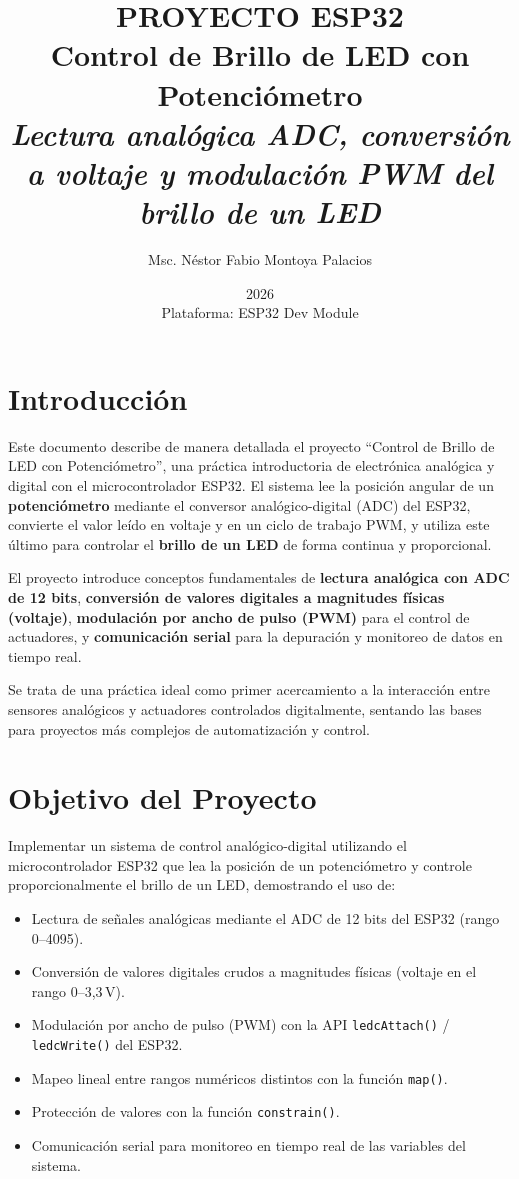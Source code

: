 \documentclass[12pt,a4paper]{article}
\title{\Huge\textbf{PROYECTO ESP32} \\ \Large Control de Brillo de LED con Potenciómetro \\ \vspace{0.5cm} \normalsize \textit{Lectura analógica ADC, conversión a voltaje y modulación PWM del brillo de un LED}}
\author{Msc. Néstor Fabio Montoya Palacios}
\date{2026 \\ \vspace{0.2cm} \small Plataforma: ESP32 Dev Module}
\begin{document}
\maketitle
\tableofcontents
\newpage

\section{Introducción}

Este documento describe de manera detallada el proyecto ``Control de Brillo de LED con Potenciómetro'', una práctica introductoria de electrónica analógica y digital con el microcontrolador ESP32. El sistema lee la posición angular de un \textbf{potenciómetro} mediante el conversor analógico-digital (ADC) del ESP32, convierte el valor leído en voltaje y en un ciclo de trabajo PWM, y utiliza este último para controlar el \textbf{brillo de un LED} de forma continua y proporcional.

El proyecto introduce conceptos fundamentales de \textbf{lectura analógica con ADC de 12 bits}, \textbf{conversión de valores digitales a magnitudes físicas (voltaje)}, \textbf{modulación por ancho de pulso (PWM)} para el control de actuadores, y \textbf{comunicación serial} para la depuración y monitoreo de datos en tiempo real.

Se trata de una práctica ideal como primer acercamiento a la interacción entre sensores analógicos y actuadores controlados digitalmente, sentando las bases para proyectos más complejos de automatización y control.

\section{Objetivo del Proyecto}

Implementar un sistema de control analógico-digital utilizando el microcontrolador ESP32 que lea la posición de un potenciómetro y controle proporcionalmente el brillo de un LED, demostrando el uso de:
\begin{itemize}
    \item Lectura de señales analógicas mediante el ADC de 12 bits del ESP32 (rango 0--4095).
    \item Conversión de valores digitales crudos a magnitudes físicas (voltaje en el rango 0--3,3\,V).
    \item Modulación por ancho de pulso (PWM) con la API \texttt{ledcAttach()} / \texttt{ledcWrite()} del ESP32.
    \item Mapeo lineal entre rangos numéricos distintos con la función \texttt{map()}.
    \item Protección de valores con la función \texttt{constrain()}.
    \item Comunicación serial para monitoreo en tiempo real de las variables del sistema.
\end{itemize}
\end{document}
